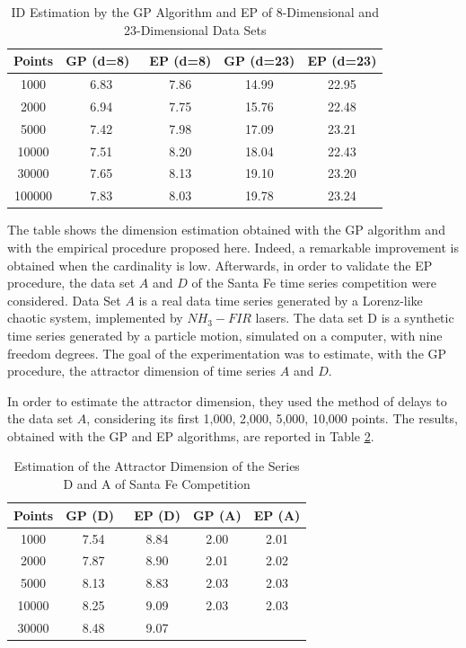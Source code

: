 \documentclass[journal]{IEEEtran}
\begin{document}
\begin{table}[!t]
  \renewcommand{\arraystretch}{2.5}
  \caption{ID Estimation by the GP Algorithm and EP of 8-Dimensional and 23-Dimensional Data Sets}
  \label{tbl_gp_ep_comp}
  \centering
  \begin{tabular}{c||c||c||c||c}
  \hline
  \bfseries Points & \bfseries GP (d=8)\ & \bfseries EP (d=8) & \bfseries GP (d=23) & \bfseries EP (d=23)\\
  \hline\hline
  1000 & 6.83 & 7.86 & 14.99 & 22.95\\
  2000 & 6.94 & 7.75 & 15.76 & 22.48\\
  5000 & 7.42 & 7.98 & 17.09 & 23.21\\
  10000 & 7.51 & 8.20 & 18.04 & 22.43\\
  30000 & 7.65 & 8.13 & 19.10 & 23.20\\
  100000 & 7.83 & 8.03 & 19.78 & 23.24\\
  \hline
  \end{tabular}
\end{table}


The table shows the dimension estimation obtained with the GP algorithm and with the empirical procedure proposed here.
Indeed, a remarkable improvement is obtained when the cardinality is low. Afterwards, in order to validate the EP procedure, 
the data set \(A\) \cite{Tang94} and \(D\) \cite{Pineda94} of the Santa Fe time series competition were considered.
Data Set \(A\) is a real data time series generated by a Lorenz-like chaotic system, implemented by \(NH_3-FIR\) lasers. 
The data set D is a synthetic time series generated by a particle motion, simulated on a computer, with nine freedom degrees. 
The goal of the experimentation was to estimate, with the GP procedure, the attractor dimension of time series \(A\) and \(D\).

In order to estimate the attractor dimension, they used the method of delays \cite{Kaplan95, Ott93} to the data set \(A\), 
considering its first 1,000, 2,000, 5,000, 10,000 points. The results, obtained with the GP and EP algorithms, are reported in Table \ref{tbl_gp_ep_santa}. 



\begin{table}[!t]
  \renewcommand{\arraystretch}{2.5}
  \caption{Estimation of the Attractor Dimension of the Series D and A of Santa Fe Competition}
  \label{tbl_gp_ep_santa}
  \centering
  \begin{tabular}{c||c||c||c||c}
  \hline
  \bfseries Points & \bfseries GP (D)\ & \bfseries EP (D) & \bfseries GP (A) & \bfseries EP (A)\\
  \hline\hline
  1000 & 7.54 & 8.84 & 2.00 & 2.01\\
  2000 & 7.87 & 8.90 & 2.01 & 2.02\\
  5000 & 8.13 & 8.83 & 2.03 & 2.03\\
  10000 & 8.25 & 9.09 & 2.03 & 2.03\\
  30000 & 8.48 & 9.07\\
  \hline
  \end{tabular}
\end{table}
\end{document}
